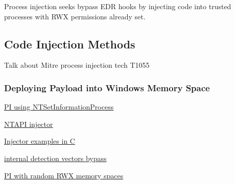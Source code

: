 Process injection seeks bypass EDR hooks by injecting code into trusted processes with RWX permissions already set.

\subsection{Code Injection Methods}

Talk about Mitre process injection tech T1055 \autocite{Mitre:2017}

\subsubsection{Deploying Payload into Windows Memory Space}


\autocite{Zhan:2018}

\href{https://www.riskinsight-wavestone.com/en/2023/10/process-injection-using-ntsetinformationprocess/}{PI using NTSetInformationProcess}

\href{https://github.com/elddy/Windows-NTAPI-Injector}{NTAPI injector} 

\href{https://gist.github.com/WKL-Sec/96e17188e4c159c2cdf7ff2c111130cc#file-local-c}{Injector examples in C}

\href{https://www.unknowncheats.me/forum/anti-cheat-bypass/286274-internal-detection-vectors-bypass.html}{internal detection vectors bypass}

\href{https://medium.com/@s12deff/process-injection-with-random-rwx-memory-spaces-3e3651149527}{PI with random RWX memory spaces}
